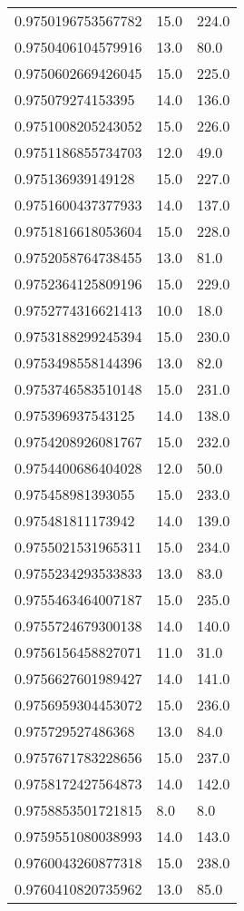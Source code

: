 \begin{center}
\begin{supertabular}[H]{p{0.30\textwidth}p{0.05\textwidth}p{0.05\textwidth}}
0.9750196753567782 & 15.0 & 224.0 \\ 
0.9750406104579916 & 13.0 & 80.0 \\ 
0.9750602669426045 & 15.0 & 225.0 \\ 
0.975079274153395 & 14.0 & 136.0 \\ 
0.9751008205243052 & 15.0 & 226.0 \\ 
0.9751186855734703 & 12.0 & 49.0 \\ 
0.975136939149128 & 15.0 & 227.0 \\ 
0.9751600437377933 & 14.0 & 137.0 \\ 
0.9751816618053604 & 15.0 & 228.0 \\ 
0.9752058764738455 & 13.0 & 81.0 \\ 
0.9752364125809196 & 15.0 & 229.0 \\ 
0.9752774316621413 & 10.0 & 18.0 \\ 
0.9753188299245394 & 15.0 & 230.0 \\ 
0.9753498558144396 & 13.0 & 82.0 \\ 
0.9753746583510148 & 15.0 & 231.0 \\ 
0.975396937543125 & 14.0 & 138.0 \\ 
0.9754208926081767 & 15.0 & 232.0 \\ 
0.9754400686404028 & 12.0 & 50.0 \\ 
0.975458981393055 & 15.0 & 233.0 \\ 
0.975481811173942 & 14.0 & 139.0 \\ 
0.9755021531965311 & 15.0 & 234.0 \\ 
0.9755234293533833 & 13.0 & 83.0 \\ 
0.9755463464007187 & 15.0 & 235.0 \\ 
0.9755724679300138 & 14.0 & 140.0 \\ 
0.9756156458827071 & 11.0 & 31.0 \\ 
0.9756627601989427 & 14.0 & 141.0 \\ 
0.9756959304453072 & 15.0 & 236.0 \\ 
0.975729527486368 & 13.0 & 84.0 \\ 
0.9757671783228656 & 15.0 & 237.0 \\ 
0.9758172427564873 & 14.0 & 142.0 \\ 
0.9758853501721815 & 8.0 & 8.0 \\ 
0.9759551080038993 & 14.0 & 143.0 \\ 
0.9760043260877318 & 15.0 & 238.0 \\ 
0.9760410820735962 & 13.0 & 85.0 \\ 

\end{supertabular}
\end{center}
